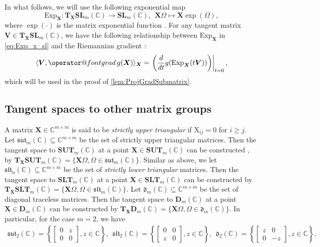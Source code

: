 \documentclass[final,onefignum,onetabnum]{siamart190516}
\makeatletter
\newcommand{\matr}[1]{\boldsymbol{#1}}
\newcommand{\ProjGrad}[2]{\mathop{{\operator@font grad} }#1(#2)}
\newcommand{\CC}{\mathbb{C}}
\newcommand{\matrelem}[1]{\mathrm{#1}}
\newcommand{\SL}{\mathbf{SL}}
\newcommand{\SUT}{\mathbf{SUT}}
\newcommand{\SLT}{\mathbf{SLT}}
\newcommand{\DT}{\mathbf{D}}
\newcommand{\sut}{\mathfrak{sut}}
\newcommand{\slt}{\mathfrak{slt}}
\newcommand{\sdt}{\mathfrak{d}}
\makeatother
\begin{document}
In what follows, we will use the following exponential map  
\begin{equation}\label{eq:Exp_x_sl}
\text{Exp}_{\matr{X}}: \mathbf{T}_{\matr{X}}\SL_{m}(\CC)  \to \SL_{m}(\CC),\ \ \matr{X}\Omega\mapsto\matr{X} \exp(\Omega), 
\end{equation}
where 
$\exp(\cdot)$ is the matrix exponential function \cite{absil2009optimization,baker2012matrix,Hall15:lie}.
For any tangent matrix $\matr{V}\in \mathbf{T}_{\matr{X}}\SL_{m}(\CC)$, we have the following relationship between $\text{Exp}_{\matr{X}}$ in \cref{eq:Exp_x_sl} and the Riemannian gradient \cite[Eq. (3.31)]{absil2009optimization}: 
\begin{equation}\label{eq:gradient_exp_map}
\langle\matr{V},\ProjGrad{g}{\matr{X}}\rangle_{\matr{X}}  =
\left.\left( \frac{d}{dt} g (\text{Exp}_{\matr{X}}(t\matr{V}) )\right)\right|_{t=0},
\end{equation}
which will be used in the proof of \cref{lem:ProjGradSubmatrix}. 

\subsection{Tangent spaces to other matrix groups}\label{subsec:tang_22}

A matrix $\matr{X}\in\CC^{m\times m}$ is said to be \emph{strictly upper triangular} if $\matrelem{X}_{ij}=0$ for $i\geq j$.
Let $\sut_{m}(\CC)\subseteq\CC^{m\times m}$ be the set of strictly upper triangular matrices.
Then the tangent space to $\SUT_{m}(\CC)$ at a point $\matr{X}\in\SUT_{m}(\CC)$ can be constructed \cite[Eq. (3.11)]{baker2012matrix}, \cite[Section 6.4]{afsari2004gradient} by $\mathbf{T}_{\matr{X}}\SUT_{m}(\CC) = \{\matr{X}\Omega, \Omega\in\sut_{m}(\CC)\}$. 
Similar as above, we let  $\slt_{n}(\CC)\subseteq\CC^{m\times m}$ be the set of \emph{strictly lower triangular} matrices.
Then the tangent space to $\SLT_{m}(\CC)$ at a point $\matr{X}\in\SLT_{m}(\CC)$ can be constructed by $\mathbf{T}_{\matr{X}}\SLT_{m}(\CC) = \{\matr{X}\Omega, \Omega\in\slt_{m}(\CC)\}$.
Let $\sdt_{m}(\CC)\subseteq\CC^{m\times m}$ be the set of diagonal traceless matrices. 
Then the tangent space to $\DT_{m}(\CC)$ at a point $\matr{X}\in\DT_{m}(\CC)$ can be constructed by $\mathbf{T}_{\matr{X}}\DT_{m}(\CC) = \{\matr{X}\Omega, \Omega\in\sdt_{m}(\CC)\}$. 
In particular, for the case $m=2$, we have 
{\small
\begin{align*}
\sut_{2}(\CC) = 
\left\{\begin{bmatrix}
0 &  z\\
0& 0
\end{bmatrix},
z\in\CC\right\},\ \ 
\slt_{2}(\CC) = 
\left\{\begin{bmatrix}
0 &  0\\
z& 0
\end{bmatrix},
z\in\CC\right\},\ \ 
\sdt_{2}(\CC) = 
\left\{\begin{bmatrix}
z &  0\\
0& -z
\end{bmatrix},
z\in\CC \right\}.
\end{align*}}
\end{document}
